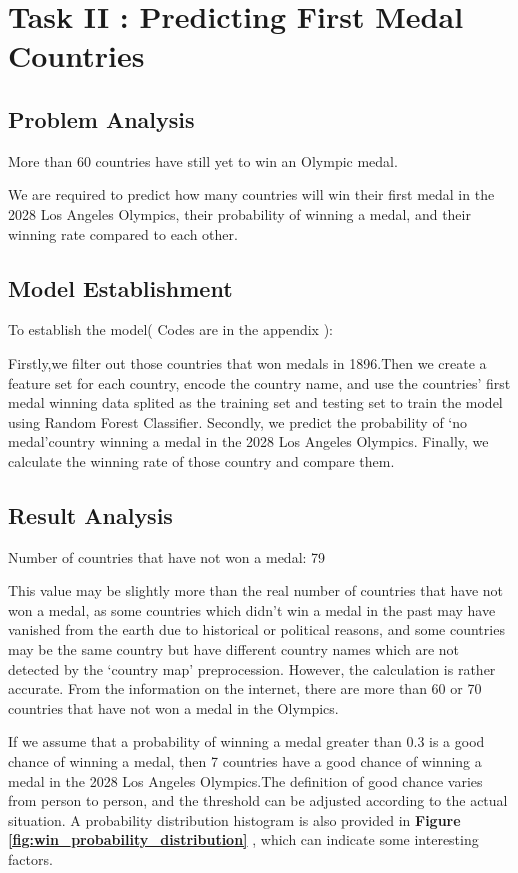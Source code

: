 \section{Task II : Predicting First Medal Countries}
\subsection{Problem Analysis}

More than 60 countries have still yet to win an Olympic medal.

We are required to predict how many countries will win their first medal in the 2028 Los Angeles Olympics, their probability of winning a medal, and their winning rate compared to each other.
\subsection{Model Establishment}

To establish the model( Codes are in the appendix ):

Firstly,we filter out those countries that won medals in 1896.Then we create a feature set for each country, encode the country name, and use the countries' first medal winning data splited as the training set and testing set to train the model using Random Forest Classifier.
Secondly, we predict the probability of `no medal'country winning a medal in the 2028 Los Angeles Olympics.
Finally, we calculate the winning rate of those country and compare them.



\subsection{Result Analysis}
Number of countries that have not won a medal: 79

This value may be slightly more than the real number of countries that have not won a medal, as some countries which didn't win a medal in the past may have vanished from the earth due to historical or political reasons, and some countries may be the same country but have different country names which are not detected by the `country map' preprocession. However, the calculation is rather accurate. From the information on the internet, there are more than 60 or 70 countries that have not won a medal in the Olympics.

If we assume that a probability of winning a medal greater than 0.3 is a good chance of winning a medal, then 7 countries have a good chance of winning a medal in the 2028 Los Angeles Olympics.The definition of good chance varies from person to person, and the threshold can be adjusted according to the actual situation. A probability distribution histogram is also provided in \textbf{Figure \ref{fig:win_probability_distribution}} , which can indicate some interesting factors.


